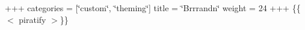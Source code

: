 +++ categories = \mbox{[}\char`\"{}custom\char`\"{}, \char`\"{}theming\char`\"{}\mbox{]} title = \char`\"{}\+Brrrand\textquotesingle{}n\char`\"{} weight = 24 +++ \{\{$<$ piratify $>$\}\} 